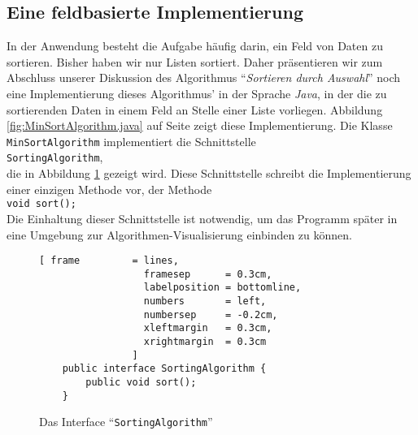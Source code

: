 \subsection{Eine feldbasierte Implementierung}
In der Anwendung besteht die Aufgabe h\"aufig darin, ein Feld von Daten zu sortieren.
Bisher haben wir nur Listen sortiert.  Daher pr\"asentieren wir
zum Abschluss unserer Diskussion des Algorithmus ``\emph{Sortieren durch Auswahl}''
noch eine Implementierung dieses Algorithmus' in der Sprache \textsl{Java},
in der die zu sortierenden Daten in einem Feld an Stelle einer Liste vorliegen.
Abbildung \ref{fig:MinSortAlgorithm.java} auf Seite \pageref{fig:MinSortAlgorithm.java} zeigt
diese Implementierung.  Die Klasse \texttt{MinSortAlgorithm} implementiert die
Schnittstelle \\[0.1cm]
\hspace*{1.3cm} \texttt{SortingAlgorithm}, \\[0.1cm]
die in Abbildung
\ref{fig:SortingAlgorithm.java} gezeigt wird.  Diese Schnittstelle schreibt die
Implementierung einer einzigen Methode vor, der Methode \\[0.1cm]
\hspace*{1.3cm} \texttt{void sort();} \\[0.1cm]
Die Einhaltung dieser Schnittstelle ist notwendig, um das Programm sp\"ater in eine Umgebung
zur Algorithmen-Visualisierung einbinden zu k\"onnen.

\begin{figure}[!ht]
  \centering
\begin{Verbatim}[ frame         = lines, 
                  framesep      = 0.3cm, 
                  labelposition = bottomline,
                  numbers       = left,
                  numbersep     = -0.2cm,
                  xleftmargin   = 0.3cm,
                  xrightmargin  = 0.3cm
                ]
    public interface SortingAlgorithm {
        public void sort();
    }
\end{Verbatim}
\vspace*{-0.3cm}
  \caption{Das Interface ``\texttt{SortingAlgorithm}''}
  \label{fig:SortingAlgorithm.java}
\end{figure}


